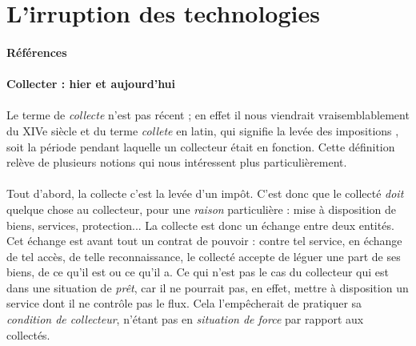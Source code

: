 \section{L'irruption des technologies}
\paragraph{Références} \cite{Richesses0}

\paragraph{Collecter : hier et aujourd'hui}

\paragraph{} Le terme de \emph{collecte} n'est pas récent ; en effet il nous viendrait vraisemblablement
du XIVe siècle et du terme \emph{collete} en latin, qui signifie la \guillemotleft levée des impositions \guillemotright,
soit la période pendant laquelle un collecteur était en fonction. Cette définition relève de plusieurs notions
qui nous intéressent plus particulièrement.

\paragraph{} Tout d'abord, la collecte c'est la levée d'un impôt. C'est donc que le collecté \emph{doit}
quelque chose au collecteur, pour une \emph{raison} particulière : mise à disposition de biens, services,
protection... La collecte est donc un échange entre deux entités. Cet échange est avant tout un contrat de
pouvoir : contre tel service, en échange de tel accès, de telle reconnaissance, le collecté accepte de
léguer une part de ses biens, de ce qu'il est ou ce qu'il a. Ce qui n'est pas le cas du collecteur qui est
dans une situation de \emph{prêt}, car il ne pourrait pas, en effet, mettre à disposition un service dont
il ne contrôle pas le flux. Cela l'empêcherait de pratiquer sa \emph{condition de collecteur}, n'étant pas en
\emph{situation de force} par rapport aux collectés.

